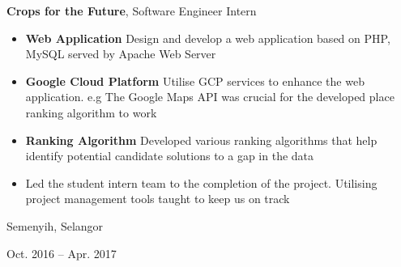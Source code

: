 \documentclass[10pt, letterpaper]{article}
\newenvironment{highlights}{
    \begin{itemize}[
        topsep=0.10 cm,
        parsep=0.10 cm,
        partopsep=0pt,
        itemsep=0pt,
        leftmargin=0.4 cm + 10pt
    ]
}{
    \end{itemize}
} %
\newenvironment{twocolentry}[2][]{
    \onecolentry
    \def\secondColumn{#2}
    \setcolumnwidth{\fill, 4.5 cm}
    \begin{paracol}{2}
}{
    \switchcolumn \raggedleft \secondColumn
    \end{paracol}
    \endonecolentry
} %
\let\hrefWithoutArrow\href
\renewcommand{\href}[2]{\hrefWithoutArrow{#1}{\ifthenelse{\equal{#2}{}}{ }{#2 }\raisebox{.15ex}{\footnotesize \faExternalLink*}}}
\begin{document}
        \vspace{0.2 cm}

        \begin{twocolentry}{
            Semenyih, Selangor

        Oct. 2016 – Apr. 2017
        }
            \textbf{Crops for the Future}, Software Engineer Intern
            \begin{highlights}
                \item \textbf{Web Application} Design and develop a web application based on PHP, MySQL served by Apache Web Server
                \item \textbf{Google Cloud Platform} Utilise GCP services to enhance the web application. 
                    e.g The Google Maps API was crucial for the developed place ranking algorithm to work
                \item \textbf{Ranking Algorithm} Developed various ranking algorithms that help identify potential candidate solutions to a gap in the data
                \item Led the student intern team to the completion of the project. Utilising project management tools taught to keep us on track
            \end{highlights}
        \end{twocolentry}



    



        



\end{document}
